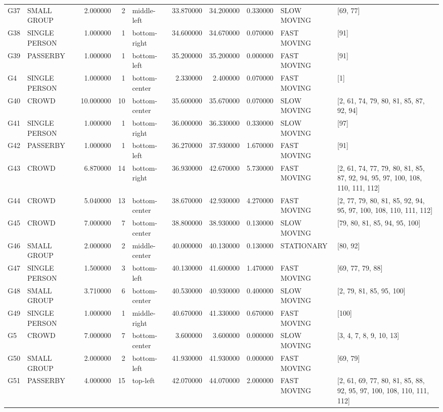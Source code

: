 \begin{table}
\begin{tabular}{llrrlrrrll}
G37 & SMALL GROUP & 2.000000 & 2 & middle-left & 33.870000 & 34.200000 & 0.330000 & SLOW MOVING & [69, 77] \\
G38 & SINGLE PERSON & 1.000000 & 1 & bottom-right & 34.600000 & 34.670000 & 0.070000 & FAST MOVING & [91] \\
G39 & PASSERBY & 1.000000 & 1 & bottom-left & 35.200000 & 35.200000 & 0.000000 & FAST MOVING & [91] \\
G4 & SINGLE PERSON & 1.000000 & 1 & bottom-center & 2.330000 & 2.400000 & 0.070000 & FAST MOVING & [1] \\
G40 & CROWD & 10.000000 & 10 & bottom-center & 35.600000 & 35.670000 & 0.070000 & SLOW MOVING & [2, 61, 74, 79, 80, 81, 85, 87, 92, 94] \\
G41 & SINGLE PERSON & 1.000000 & 1 & bottom-right & 36.000000 & 36.330000 & 0.330000 & SLOW MOVING & [97] \\
G42 & PASSERBY & 1.000000 & 1 & bottom-left & 36.270000 & 37.930000 & 1.670000 & FAST MOVING & [91] \\
G43 & CROWD & 6.870000 & 14 & bottom-right & 36.930000 & 42.670000 & 5.730000 & FAST MOVING & [2, 61, 74, 77, 79, 80, 81, 85, 87, 92, 94, 95, 97, 100, 108, 110, 111, 112] \\
G44 & CROWD & 5.040000 & 13 & bottom-center & 38.670000 & 42.930000 & 4.270000 & FAST MOVING & [2, 77, 79, 80, 81, 85, 92, 94, 95, 97, 100, 108, 110, 111, 112] \\
G45 & CROWD & 7.000000 & 7 & bottom-center & 38.800000 & 38.930000 & 0.130000 & SLOW MOVING & [79, 80, 81, 85, 94, 95, 100] \\
G46 & SMALL GROUP & 2.000000 & 2 & middle-center & 40.000000 & 40.130000 & 0.130000 & STATIONARY & [80, 92] \\
G47 & SINGLE PERSON & 1.500000 & 3 & bottom-left & 40.130000 & 41.600000 & 1.470000 & FAST MOVING & [69, 77, 79, 88] \\
G48 & SMALL GROUP & 3.710000 & 6 & bottom-center & 40.530000 & 40.930000 & 0.400000 & SLOW MOVING & [2, 79, 81, 85, 95, 100] \\
G49 & SINGLE PERSON & 1.000000 & 1 & middle-right & 40.670000 & 41.330000 & 0.670000 & FAST MOVING & [100] \\
G5 & CROWD & 7.000000 & 7 & bottom-center & 3.600000 & 3.600000 & 0.000000 & SLOW MOVING & [3, 4, 7, 8, 9, 10, 13] \\
G50 & SMALL GROUP & 2.000000 & 2 & bottom-left & 41.930000 & 41.930000 & 0.000000 & FAST MOVING & [69, 79] \\
G51 & PASSERBY & 4.000000 & 15 & top-left & 42.070000 & 44.070000 & 2.000000 & FAST MOVING & [2, 61, 69, 77, 80, 81, 85, 88, 92, 95, 97, 100, 108, 110, 111, 112] \\

\end{tabular}
\end{table}
